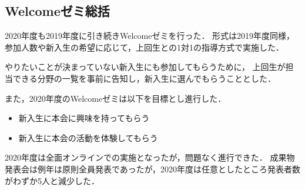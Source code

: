 \subsection*{Welcomeゼミ総括}


2020年度も2019年度に引き続きWelcomeゼミを行った．
形式は2019年度同様，参加人数や新入生の希望に応じて，上回生との1対1の指導方式で実施した．

やりたいことが決まっていない新入生にも参加してもらうために，
上回生が担当できる分野の一覧を事前に告知し，新入生に選んでもらうこととした．

また，2020年度のWelcomeゼミは以下を目標とし進行した．
\begin{itemize}
	\item 新入生に本会に興味を持ってもらう
	\item 新入生に本会の活動を体験してもらう
\end{itemize}

2020年度は全面オンラインでの実施となったが，問題なく進行できた．
成果物発表会は例年は原則全員発表であったが，2020年度は任意としたところ発表者数がわずか5人と減少した．

